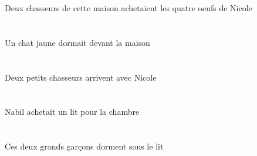 \begin{exe}
 Deux chasseurs de cette maison achetaient les quatre oeufs de Nicole
\ex\glll
   \INDSgAbs{}   \jauneDSg{}   \chatDSgAbs{}    \DEFSgObl{}   \maisonDSgObl{}   \DEVANT{}  \dormirViPstDSg{} \\
   \INDSgAbsP{}   \jauneDSgP{}   \chatDSgAbsP{}    \DEFSgOblP{}   \maisonDSgOblP{}   \DEVANTP{}  \dormirViPstDSgP{} \\
   \INDSgAbsG{}   \jauneDSgG{}   \chatDSgAbsG{}    \DEFSgOblG{}   \maisonDSgOblG{}   \DEVANTG{}  \dormirViPstDSgG{} \\
 Un chat jaune dormait devant la maison
\ex\glll
    \INDSgObl{}   \NicoleBSgObl{}   \AVEC{}   \INDDuAbs{}   \petitCDu{}   \chasseurCDuAbs{}  \arriverViPrsCDu{} \\
    \INDSgOblP{}   \NicoleBSgOblP{}   \AVECP{}   \INDDuAbsP{}   \petitCDuP{}   \chasseurCDuAbsP{}  \arriverViPrsCDuP{} \\
    \INDSgOblG{}   \NicoleBSgOblG{}   \AVECG{}   \INDDuAbsG{}   \petitCDuG{}   \chasseurCDuAbsG{}  \arriverViPrsCDuG{} \\
 Deux petits chasseurs arrivent avec Nicole
\ex\glll
   \INDSgErg{}   \NabilDSgErg{}    \DEFSgObl{}   \chambreBSgObl{}   \POUR{}   \INDSgAbs{}   \litDSgAbs{}  \acheterVtPstDSg{} \\
   \INDSgErgP{}   \NabilDSgErgP{}    \DEFSgOblP{}   \chambreBSgOblP{}   \POURP{}   \INDSgAbsP{}   \litDSgAbsP{}  \acheterVtPstDSgP{} \\
   \INDSgErgG{}   \NabilDSgErgG{}    \DEFSgOblG{}   \chambreBSgOblG{}   \POURG{}   \INDSgAbsG{}   \litDSgAbsG{}  \acheterVtPstDSgG{} \\
 Nabil achetait un lit pour la chambre
\ex\glll
   \DEMDuAbs{}   \grandDDu{}   \garconDDuAbs{}    \DEFSgObl{}   \litDSgObl{}   \SOUS{}  \dormirViPrsDDu{} \\
   \DEMDuAbsP{}   \grandDDuP{}   \garconDDuAbsP{}    \DEFSgOblP{}   \litDSgOblP{}   \SOUSP{}  \dormirViPrsDDuP{} \\
   \DEMDuAbsG{}   \grandDDuG{}   \garconDDuAbsG{}    \DEFSgOblG{}   \litDSgOblG{}   \SOUSG{}  \dormirViPrsDDuG{} \\
 Ces deux grands garçons dorment sous le lit
\ex\glll
   \INDPlErg{}   \grandDPl{}   \garconDPlErg{}    \DEFPlObl{}    \DEFSgObl{}   \maisonDSgObl{}   \DE{}   \filleCPlObl{}   \A{}   \INDPlAbs{}   \sourisBPlAbs{}  \montrerVdPstBPl{} \\
   \INDPlErgP{}   \grandDPlP{}   \garconDPlErgP{}    \DEFPlOblP{}    \DEFSgOblP{}   \maisonDSgOblP{}   \DEP{}   \filleCPlOblP{}   \AP{}   \INDPlAbsP{}   \sourisBPlAbsP{}  \montrerVdPstBPlP{} \\

\end{exe}
